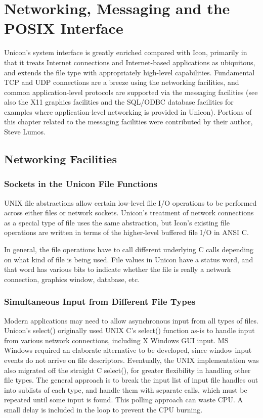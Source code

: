 \chapter{Networking, Messaging and the POSIX Interface}

Unicon's system interface is greatly enriched compared with Icon,
primarily in that it treats Internet connections and Internet-based
applications as ubiquitous, and extends the file type with
appropriately high-level capabilities.  Fundamental TCP and UDP
connections are a breeze using the networking facilities, and common
application-level protocols are supported via the messaging facilities
(see also the X11 graphics facilities and the SQL/ODBC database
facilities for examples where application-level networking is provided
in Unicon). Portions of this chapter related to the messaging
facilities were contributed by their author, Steve Lumos.

\section{Networking Facilities}

\subsection{Sockets in the Unicon File Functions}

UNIX file abstractions allow certain low-level file I/O
operations to be performed across either files or network sockets.
Unicon's treatment of network connections as a special type of file
uses the same abstraction, but Icon's existing file operations are
written in terms of the higher-level buffered file I/O in ANSI C.

In general, the file operations have to call different underlying C calls 
depending on what kind of file is being used.  File values in Unicon
have a status word, and that word has various bits to indicate whether
the file is really a network connection, graphics window, database, etc.

\subsection{Simultaneous Input from Different File Types}

Modern applications may need to allow asynchronous input from all
types of files. Unicon's select() originally used UNIX C's select()
function as-is to handle input from various network connections,
including X Windows GUI input.  MS Windows required an elaborate
alternative to be developed, since window input events do not
arrive on file descriptors.  Eventually, the UNIX implementation
was also migrated off the straight C select(), for greater flexibility
in handling other file types.  The general approach is to break the
input list of input file handles out into sublists of each type, and
handle them with separate calls, which must be repeated until some
input is found.  This polling approach can waste CPU. A small delay
is included in the loop to prevent the CPU burning.


